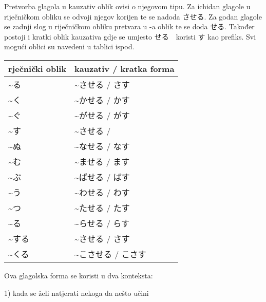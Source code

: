 
\author{Tomislav Mamić}

		
	
	Pretvorba glagola u kauzativ oblik ovisi o njegovom tipu.
	Za ichidan glagole u riječničkom obliku se odvoji njegov korijen te se nadoda させる.
	Za godan glagole se zadnji slog u riječničkom obliku pretvara u -a oblik te se doda せる.
	Također postoji i kratki oblik kauzativa gdje se umjesto せる　koristi す kao prefiks.
	Svi mogući oblici su navedeni u tablici ispod.
	
	\begin{table}[h]
		\centering
		\begin{tabular}{l l}\toprule[2pt]
			rječnički oblik & kauzativ / kratka forma\\
			\midrule
			\textasciitilde る & \textasciitilde させる / さす\\
			\textasciitilde く & \textasciitilde かせる / かす\\
			\textasciitilde ぐ & \textasciitilde がせる / がす\\
			\textasciitilde す & \textasciitilde させる / \\
			\textasciitilde ぬ & \textasciitilde なせる / なす\\
			\textasciitilde む & \textasciitilde ませる / ます\\
			\textasciitilde ぶ & \textasciitilde ばせる / ばす\\
			\textasciitilde う & \textasciitilde わせる / わす\\
			\textasciitilde つ & \textasciitilde たせる / たす\\
			\textasciitilde る & \textasciitilde らせる / らす\\
			\textasciitilde する　& \textasciitilde させる / さす\\
			\textasciitilde くる　&\textasciitilde こさせる / こさす\\
			\bottomrule[2pt]
		\end{tabular}
	\end{table}
	
	
	
	Ova glagolska forma se koristi u dva konteksta:

	1) kada se želi natjerati nekoga da nešto učini
	
